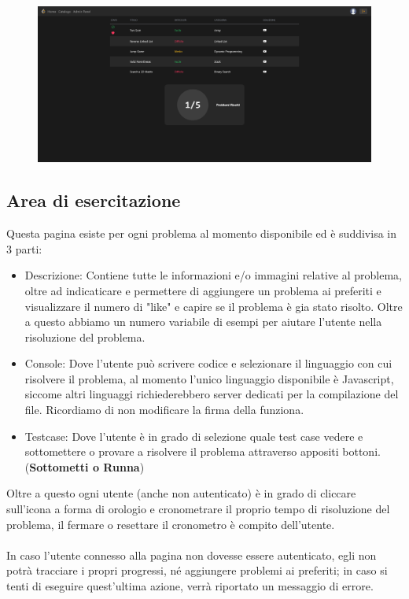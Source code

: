 \documentclass[11pt, a4paper]{article}
\theoremstyle{definition}
\begin{document}
\begin{figure}[H]
  \centering
  \includegraphics[width=\textwidth]{materiale/sito/Catalogo.png}
\end{figure}

\subsection{Area di esercitazione}
Questa pagina esiste per ogni problema al momento disponibile ed è suddivisa in 3 parti:
\begin{itemize}
  \item Descrizione: Contiene tutte le informazioni e/o immagini relative al problema, oltre ad indicaticare e permettere di aggiungere un problema ai preferiti e visualizzare il numero di "like" e capire se il problema è gia stato risolto. Oltre a questo abbiamo un numero variabile di esempi per aiutare l'utente nella risoluzione del problema.
  \item Console: Dove l'utente può scrivere codice e selezionare il linguaggio con cui risolvere il problema, al momento l'unico linguaggio disponibile è Javascript, siccome altri linguaggi richiederebbero server dedicati per la compilazione del file. Ricordiamo di non modificare la firma della funziona.
  \item Testcase: Dove l'utente è in grado di selezione quale test case vedere e sottomettere o provare a risolvere il problema attraverso appositi bottoni. (\textbf{Sottometti o Runna})
\end{itemize}
Oltre a questo ogni utente (anche non autenticato) è in grado di cliccare sull'icona a forma di orologio e cronometrare il proprio tempo di risoluzione del problema, il fermare o resettare il cronometro è compito dell'utente.
\\\\
In caso l'utente connesso alla pagina non dovesse essere autenticato, egli non potrà tracciare i propri progressi, né aggiungere problemi ai preferiti; in caso si tenti di eseguire quest'ultima azione, verrà riportato un messaggio di errore.
\\\\
\end{document}
